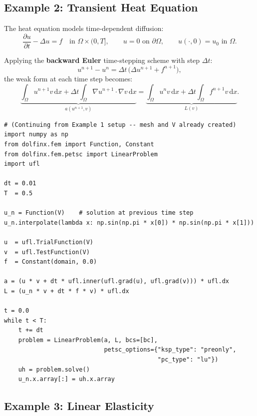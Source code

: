 \documentclass[11pt]{article}
\newcommand{\dx}{\,\mathrm{d}x}
\newcommand{\Grad}{\nabla}
\newcommand{\Lapl}{\Delta}
\newcommand{\domain}{\Omega}
\newcommand{\boundary}{\partial\Omega}
\begin{document}
\subsection{Example 2: Transient Heat Equation}
\label{sec:ex-heat}

The heat equation models time-dependent diffusion:
\begin{equation}
  \frac{\partial u}{\partial t} - \Lapl u = f
  \quad \text{in } \domain \times (0, T],
  \qquad u = 0 \text{ on } \boundary,
  \qquad u(\cdot, 0) = u_0 \text{ in } \domain.
\end{equation}

Applying the \textbf{backward Euler} time-stepping scheme with step $\Delta t$:
\begin{equation*}
  u^{n+1} - u^n = \Delta t\,\bigl(\Lapl u^{n+1} + f^{n+1}\bigr),
\end{equation*}
the weak form at each time step becomes:
\begin{equation}
  \underbrace{\int_\domain u^{n+1} v \dx
    + \Delta t \int_\domain \Grad u^{n+1} \cdot \Grad v \dx}_{a(u^{n+1},v)}
  = \underbrace{\int_\domain u^n v \dx
    + \Delta t \int_\domain f^{n+1} v \dx}_{L(v)}.
\end{equation}

\begin{lstlisting}[style=python, caption={Time-stepping loop for the heat equation (FEniCSx).}]
# (Continuing from Example 1 setup -- mesh and V already created)
import numpy as np
from dolfinx.fem import Function, Constant
from dolfinx.fem.petsc import LinearProblem
import ufl

dt = 0.01
T  = 0.5

u_n = Function(V)    # solution at previous time step
u_n.interpolate(lambda x: np.sin(np.pi * x[0]) * np.sin(np.pi * x[1]))

u  = ufl.TrialFunction(V)
v  = ufl.TestFunction(V)
f  = Constant(domain, 0.0)

a = (u * v + dt * ufl.inner(ufl.grad(u), ufl.grad(v))) * ufl.dx
L = (u_n * v + dt * f * v) * ufl.dx

t = 0.0
while t < T:
    t += dt
    problem = LinearProblem(a, L, bcs=[bc],
                            petsc_options={"ksp_type": "preonly",
                                           "pc_type": "lu"})
    uh = problem.solve()
    u_n.x.array[:] = uh.x.array
\end{lstlisting}

\subsection{Example 3: Linear Elasticity}
\label{sec:ex-elasticity}
\end{document}
